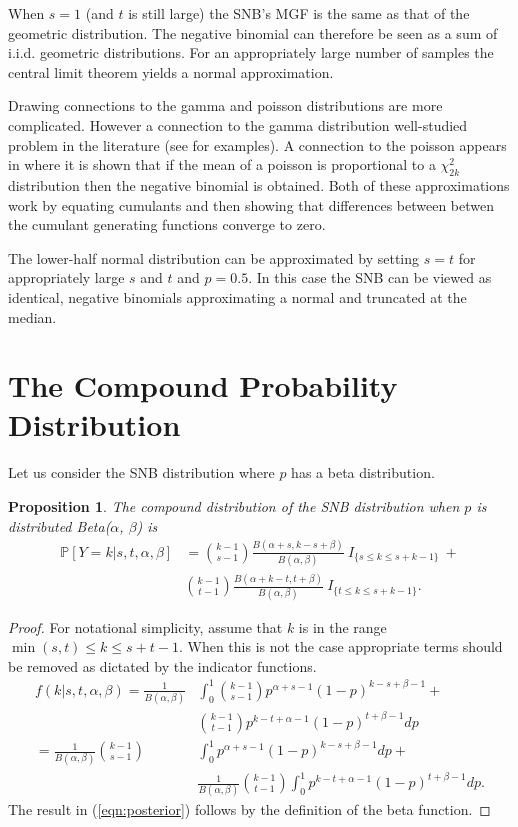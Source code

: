 \documentclass[review]{elsarticle}
\newtheorem{prop}{Proposition}
\begin{document}
When $s=1$ (and $t$ is still large) the SNB's MGF is the same as that of the
geometric distribution. The negative
binomial can therefore be seen as a sum of i.i.d. geometric distributions.
For an appropriately large number of samples the central limit theorem
yields a normal approximation.

Drawing connections to the gamma and poisson distributions are more complicated.
However a connection to the gamma distribution well-studied problem in the 
literature (see \cite{Ord1968,Guenther1972,Best1974} for examples). 
A connection to the poisson appears in \cite{Anscombe1950} where
it is shown that if the mean of a poisson is proportional
to a $\chi^2_{2k}$ distribution then the negative binomial is obtained. 
Both of these approximations work by equating cumulants and then showing 
that differences between betwen the cumulant generating
functions converge to zero.

The lower-half normal distribution can be approximated by setting $s=t$
for appropriately large $s$ and $t$ and $p = 0.5$. In this
case the SNB can be viewed as identical, negative binomials
approximating a normal and truncated at the median.

\section{The Compound Probability Distribution}

Let us consider the SNB distribution where $p$ has a beta distribution.
\begin{prop} \label{prop:bayesian}
The compound distribution of the SNB
distribution when $p$ is distributed Beta($\alpha$, $\beta$) is
\begin{align} \label{eqn:posterior}
\mathbb{P} [Y = k | s, t, \alpha, \beta ] &= 
  {k-1 \choose s-1} \frac{B\left(\alpha+s, k-s+\beta \right)}{B(\alpha, \beta)} 
    \ I_{\{s \leq k \leq s+k-1\}} \ + \nonumber \\
  & {k-1 \choose t-1} 
    \frac{B\left(\alpha + k - t, t+\beta\right)}{B(\alpha, \beta)} 
    \ I_{\{t \leq k \leq s+k-1\}}.
\end{align}
\end{prop}
\begin{proof}
For notational simplicity, assume that $k$ is in the range
$\min(s,t) \leq k \leq s+t-1$. When 
this is not the case appropriate terms should be removed as dictated by the indicator functions.
\begin{align*}
f(k | s, t, \alpha, \beta) = \frac{1}{B(\alpha, \beta)} & \int_0^1 {k-1 \choose s-1} p^{\alpha +s -1} \left(1-p\right)^{k-s+\beta-1} + \\
 & {k-1 \choose t-1} p^{k-t+\alpha-1}\left(1-p\right)^{t+\beta-1} dp \\
= \frac{1}{B(\alpha, \beta)}  {k-1 \choose s-1} & \int_0^1  p^{\alpha +s -1} \left(1-p\right)^{k-s+\beta-1} dp + \\
 & \frac{1}{B(\alpha, \beta)} {k-1 \choose t-1} \int_0^1  p^{k-t+\alpha-1}\left(1-p\right)^{t+\beta-1} dp.
\end{align*}
The result in (\ref{eqn:posterior}) follows by the definition of the 
beta function.
\end{proof}
\end{document}
